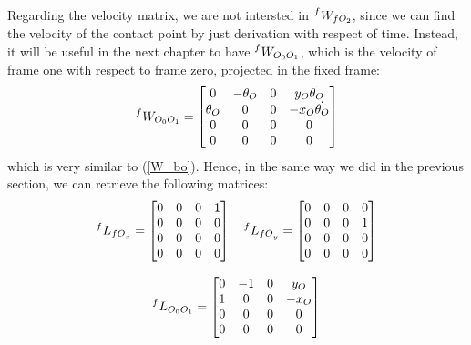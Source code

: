 \documentclass[a4paper,12pt,oneside]{report}
\begin{document}
Regarding the velocity matrix, we are not intersted in $\prescript{f}{}{W_{fO_2}}$, since we can find the velocity of the contact point by just derivation with respect of time. Instead, it will be useful in the next chapter to have $\prescript{f}{}{W_{O_0O_1}}$, which is the velocity of frame one with respect to frame zero, projected in the fixed frame:
\begin{equation}
  \prescript{f}{}{W_{O_0O_1}}=\begin{bmatrix}
    0&-\theta_O&0&y_O \dot{\theta_O}\\
    \theta_O&0&0&-x_O \dot{\theta_O}\\
    0&0&0&0\\
    0&0&0&0
  \end{bmatrix}
\end{equation}
which is very similar to (\ref{W_bo}). Hence, in the same way we did in the previous section, we can retrieve the following matrices:
\begin{equation}
  \begin{array}{c}
    \prescript{f}{}{L_{{fO}_x}}=\begin{bmatrix}
      0&0&0&1\\
      0&0&0&0\\
      0&0&0&0\\
      0&0&0&0
    \end{bmatrix} \quad
    \prescript{f}{}{L_{{fO}_y}}=\begin{bmatrix}
      0&0&0&0\\
      0&0&0&1\\
      0&0&0&0\\
      0&0&0&0
    \end{bmatrix}\\ \\
    \prescript{f}{}{L_{O_0O_1}}=\begin{bmatrix}
      0&-1&0&y_O\\
      1&0&0&-x_O\\
      0&0&0&0\\
      0&0&0&0
    \end{bmatrix}
  \end{array}
\end{equation}
\end{document}

